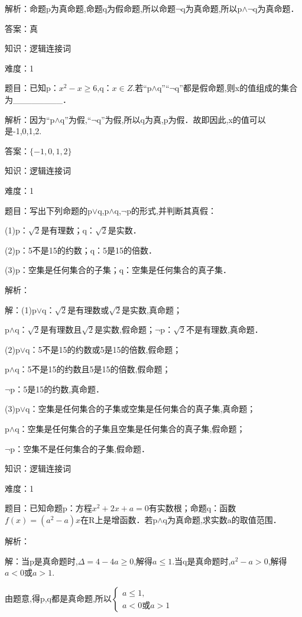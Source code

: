 \documentclass{article} %
\begin{document}
解析：命题p为真命题,命题q为假命题,所以命题$\neg$q为真命题,所以p${\wedge}$$\neg$q为真命题．

答案：真



知识：逻辑连接词

难度：1

题目：已知p：$x^{2}-x{\ge}6$,q：$x{\in}Z$.若``p${\wedge}$q''``$\neg$q''都是假命题,则x的值组成的集合为\_\_\_\_\_\_\_\_．

解析：因为``p${\wedge}$q''为假,``$\neg$q''为假,所以q为真,p为假．故即因此,x的值可以是-1,0,1,2.

答案：$\{-1,0,1,2\}$



知识：逻辑连接词

难度：1

题目：写出下列命题的p${\vee}$q,p${\wedge}$q,$\neg$p的形式,并判断其真假：

(1)p：$\sqrt{2}$是有理数；q：$\sqrt{2}$是实数．

(2)p：5不是15的约数；q：5是15的倍数．

(3)p：空集是任何集合的子集；q：空集是任何集合的真子集．

解析：

解：(1)p${\vee}$q：$\sqrt{2}$是有理数或$\sqrt{2}$是实数,真命题；

p${\wedge}$q：$\sqrt{2}$是有理数且$\sqrt{2}$是实数,假命题；$\neg$p：$\sqrt{2}$不是有理数,真命题．

(2)p${\vee}$q：5不是15的约数或5是15的倍数,假命题；

p${\wedge}$q：5不是15的约数且5是15的倍数,假命题；

$\neg$p：5是15的约数,真命题．

(3)p${\vee}$q：空集是任何集合的子集或空集是任何集合的真子集,真命题；

p${\wedge}$q：空集是任何集合的子集且空集是任何集合的真子集,假命题；

$\neg$p：空集不是任何集合的子集,假命题．



知识：逻辑连接词

难度：1

题目：已知命题p：方程$x^{2}+2x+a=0$有实数根；命题q：函数$f(x)=(a^{2}-a)x$在R上是增函数．若p${\wedge}$q为真命题,求实数a的取值范围．

解析：

解：当p是真命题时,$\Delta=4-4a\ge0$,解得$a\le 1$.当q是真命题时,$a^{2}-a>0$,解得$a<0$或$a>1$.

由题意,得p,q都是真命题,所以$\left\{
\begin{array}{l}
a\le 1, \\
a<0 或 a>1
\end{array}
\right.$
\end{document}

